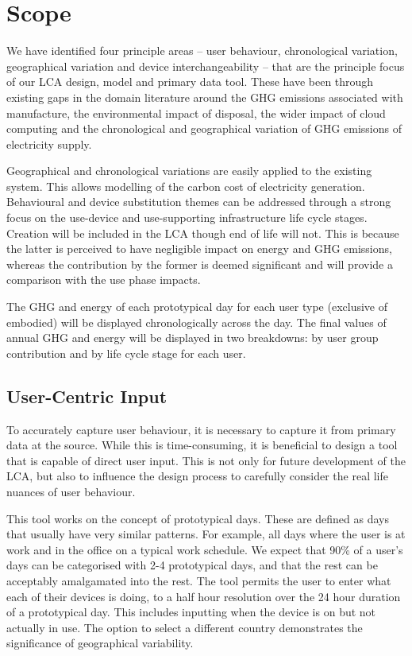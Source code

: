 \documentclass[conference]{IEEEtran}
\begin{document}
\section{Scope}
We have identified four principle areas -- user behaviour,
chronological variation, geographical variation and device
interchangeability -- that are the principle focus of our LCA design,
model and primary data tool. These have been through existing gaps in
the domain literature around the GHG emissions associated with
manufacture, the environmental impact of disposal, the wider impact of
cloud computing and the chronological and geographical variation of
GHG emissions of electricity supply.

Geographical and chronological variations are easily applied to the
existing system. This allows modelling of the carbon cost of
electricity generation. Behavioural and device substitution themes can
be addressed through a strong focus on the use-device and
use-supporting infrastructure life cycle stages. Creation will be
included in the LCA though end of life will not. This is because the
latter is perceived to have negligible impact on energy and GHG
emissions, whereas the contribution by the former is deemed
significant and will provide a comparison with the use phase impacts.

The GHG and energy of each prototypical day for each user type
(exclusive of embodied) will be displayed chronologically across the
day. The final values of annual GHG and energy will be displayed in two
breakdowns: by user group contribution and by life cycle stage for
each user.

\subsection{User-Centric Input}

To accurately capture user behaviour, it is necessary to capture it
from primary data at the source. While this is time-consuming, it is
beneficial to design a tool that is capable of direct user input. This is not
only for future development of the LCA, but also to influence the
design process to carefully consider the real life nuances of user
behaviour.

This tool works on the concept of prototypical days. These are defined
as days that usually have very similar patterns. For example, all days
where the user is at work and in the office on a typical work
schedule. We expect that 90\% of a user's days can be categorised with
2-4 prototypical days, and that the rest can be acceptably amalgamated
into the rest. The tool permits the user to enter what each of their
devices is doing, to a half hour resolution over the 24 hour duration
of a prototypical day. This includes inputting when the device is on
but not actually in use.  The option to select a different country
demonstrates the significance of geographical variability.
\end{document}
